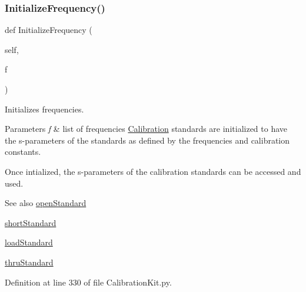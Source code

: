 \subsubsection{\texorpdfstring{Initialize\+Frequency()}{InitializeFrequency()}}
{\footnotesize\ttfamily def Initialize\+Frequency (\begin{DoxyParamCaption}\item[{}]{self,  }\item[{}]{f }\end{DoxyParamCaption})}



Initializes frequencies. 


\begin{DoxyParams}{Parameters}
{\em f} & list of frequencies \hyperlink{namespaceSignalIntegrity_1_1Measurement_1_1Calibration}{Calibration} standards are initialized to have the s-\/parameters of the standards as defined by the frequencies and calibration constants.\\
\hline
\end{DoxyParams}
Once intialized, the s-\/parameters of the calibration standards can be accessed and used. \begin{DoxySeeAlso}{See also}
\hyperlink{classSignalIntegrity_1_1Measurement_1_1CalKit_1_1CalibrationKit_1_1CalibrationKit_adfa88578140d393e4fc3d5e6976c4586}{open\+Standard} 

\hyperlink{classSignalIntegrity_1_1Measurement_1_1CalKit_1_1CalibrationKit_1_1CalibrationKit_a094c01f8f3b9b22b8759481b3d5bdb85}{short\+Standard} 

\hyperlink{classSignalIntegrity_1_1Measurement_1_1CalKit_1_1CalibrationKit_1_1CalibrationKit_af4b585ef48fed700d70b2bee7e5ffdbe}{load\+Standard} 

\hyperlink{classSignalIntegrity_1_1Measurement_1_1CalKit_1_1CalibrationKit_1_1CalibrationKit_a63691e31dc0a91dbcfe40635f9c87599}{thru\+Standard} 
\end{DoxySeeAlso}


Definition at line 330 of file Calibration\+Kit.\+py.

\mbox{\label{classSignalIntegrity_1_1Measurement_1_1CalKit_1_1CalibrationKit_1_1CalibrationKit_a3dc78f8134b7196685f6b0b5ace5e33b}} 
